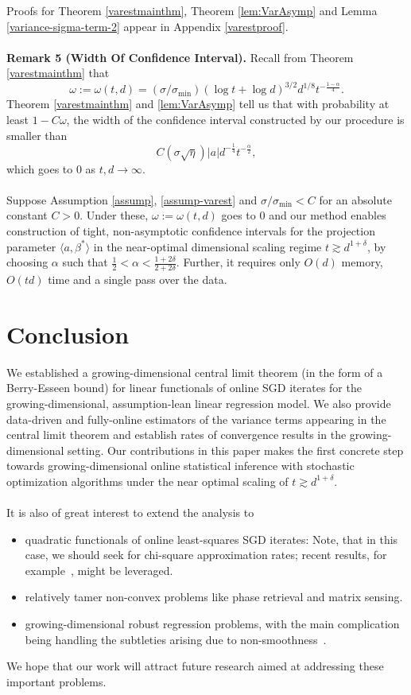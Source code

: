 \documentclass[11pt, reqno,english]{amsart}
\begin{document}
Proofs for Theorem \ref{varestmainthm}, Theorem \ref{lem:VarAsymp} and Lemma \ref{variance-sigma-term-2} appear in Appendix \ref{varestproof}.
\\\\
\noindent \textbf{Remark 5 (Width Of Confidence Interval).} Recall from Theorem \ref{varestmainthm} that $$\omega := \omega(t,d) = (\sigma/\sigma_{\min})(\log t + \log d)^{3/2}d^{1/8}t^{-\frac{1-\alpha}{4}}.$$
Theorem \ref{varestmainthm} and \ref{lem:VarAsymp} tell us that with probability at least $1 - C\omega$, the width of the confidence interval constructed by our procedure is smaller than $$C(\sigma \sqrt{\eta})|a|d^{-\frac{1}{4}}t^{-\frac{\alpha}{2}},$$ which goes to $0$ as $t,d \to \infty$.
\\\\
Suppose Assumption \ref{assump}, \ref{assump-varest} and $\sigma/\sigma_{\min} < C$ for an absolute constant $C > 0$. Under these, $\omega := \omega (t, d)$ goes to $0$ and our method enables construction of tight, non-asymptotic confidence intervals for the projection parameter $\langle a, \beta^* \rangle$ in the near-optimal dimensional scaling regime $t \gtrsim d^{1+\delta}$, by choosing $\alpha$ such that $\frac{1}{2} < \alpha < \frac{1 + 2\delta}{2 + 2\delta}$. Further, it requires only $O(d)$ memory, $O(td)$ time and a single pass over the data.
\section{Conclusion}
We established a growing-dimensional central limit theorem (in the form of a Berry-Esseen bound) for linear functionals of online  SGD iterates for the growing-dimensional, assumption-lean linear regression model. We also provide data-driven and fully-online estimators of the variance terms appearing in the central limit theorem and establish rates of convergence results in the growing-dimensional setting. Our contributions in this paper makes the first concrete step towards growing-dimensional online statistical inference with stochastic optimization algorithms under the near optimal scaling of $t \gtrsim d^{1+\delta}$. 
\\\\
It is also of great interest to extend the analysis to 
\begin{itemize}[noitemsep,leftmargin=0.2in]
    \item quadratic functionals of online least-squares SGD iterates: Note, that in this case, we should seek for chi-square approximation rates; recent results, for example~\cite{gaunt2017chi}, might be leveraged.
    \item relatively tamer non-convex problems like phase retrieval and matrix sensing.
    \item  growing-dimensional robust regression problems, with the main complication being handling the subtleties arising due to non-smoothness~\citep{jiang2025online}.
\end{itemize}   
We hope that our work will attract future research aimed at addressing these important problems.
\end{document}
